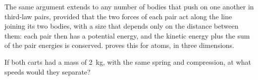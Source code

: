 The same argument extends to any number of bodies that push on one
another in third-law pairs, provided that the two forces of each pair
act along the line joining its two bodies, with a size that depends only
on the distance between them: each pair then has a potential energy, and the kinetic energy plus the sum of the pair energies
is conserved.  proves this for atoms, in three
dimensions.


\begin{selfcheck}
If both carts had a mass of \SI{2}{\kilogram}, with the same spring and
compression, at what speeds would they separate?
\end{selfcheck}
